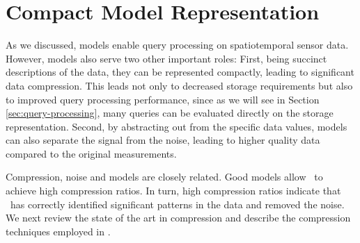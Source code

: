
\section{Compact Model Representation}
\label{sec:compression}


As we discussed, models enable query processing on spatiotemporal sensor data. However, models also serve two other important roles: First, being succinct descriptions of the data, they can be represented compactly, leading to significant data compression. This leads not only to decreased storage requirements but also to improved query processing performance, since as we will see in Section \ref{sec:query-processing}, many queries can be evaluated directly on the storage representation. Second, by abstracting out from the specific data values, models can also separate the signal from the noise, leading to higher quality data compared to the original measurements. 


Compression, noise and models are closely related. Good models allow \projName\ to achieve high compression ratios. In turn, high compression ratios indicate that \projName\ has correctly identified significant patterns in the data and removed the noise.
We next review the state of the art in compression and describe the compression techniques employed in \projName. 


